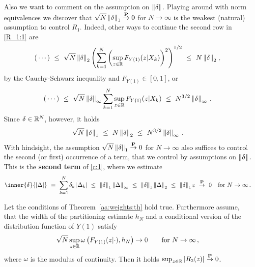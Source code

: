 \begin{remark}
  Also we want to comment on the assumption on $\left\lVert\delta\right\rVert$.
  Playing around with norm equivalences we discover that 
  $\sqrt{N}\left\lVert\delta\right\rVert_1\overset{\mathbf{P}}{\to}0$ for $N\to \infty$ is the weakest
  (natural) assumption to
  control $R_1$.
  Indeed, other ways to continue the second row in \eqref{R_1:1} are
  \begin{gather*}
    (\,\cdots)
    \ 
  \le
    \ 
  \sqrt{N}
  \norm{\delta}_2
  \left( 
  \sum_{k=1}^{N} 
  \left( 
    \sup_{z\in\R}
  F_{Y(1)}(z|X_k)
  \right)^2
\right)^{1/2}
\ 
\le
\ 
N
  \norm{\delta}_2\,,
  \end{gather*}
  by the Cauchy-Schwarz inequality and
  $
  F_{Y(1)}\in [0,1]
  $,
or
\begin{gather*}
  (\,\cdots)
  \ 
  \le
  \ 
  \sqrt{N}
  \norm{\delta}_\infty
  \sum_{k=1}^{N} 
    \sup_{z\in\R}
  F_{Y(1)}(z|X_k)
  \ 
  \le
  \ 
  N^{3/2}
  \norm{\delta}_\infty
  \,.
\end{gather*}
Since $\delta\in \mathbb{R}^N$, however, it holds
\begin{gather*}
  \sqrt{N}\norm{\delta}_1
  \ 
  \le
  \ 
  N\norm{\delta}_2
  \ 
  \le
  \ 
  N^{3/2}\norm{\delta}_\infty
  \,.
\end{gather*}
With hindsight, the assumption 
$\sqrt{N}\left\lVert\delta\right\rVert_1\overset{\mathbf{P}}{\to}0$ for $N\to \infty$ 
  also 
  suffices 
  to control the second (or first) occurrence of a term, that we control by assumptions on $\left\lVert\delta\right\rVert$.
This is the \textbf{second term} of \eqref{c:1}, where we estimate
\begin{gather*}
  \inner{\delta}{\left| \Delta \right|}
  \ 
  =
  \ 
  \sum_{k=1}^{N} 
  \delta_k
  \left| \Delta_k \right|
  \ 
  \le
  \ 
  \norm{\delta}_1
  \norm{\Delta}_\infty
  \ 
  \le
  \ 
  \norm{\delta}_1
  \norm{\Delta}_2
  \ 
  \le
  \ 
  \norm{\delta}_1
  \varepsilon
  \ 
  \overset{\P}{\to}
  \ 
  0
  \quad
  \text{for}\ 
  N\to \infty
  \,.
\end{gather*}

\end{remark}
  \begin{lemma}
    \label{aa:mean:l:r2}
    Let the conditions of Theorem~\ref{aa:weights:th} hold true.
    Furthermore assume, that the width of the partitioning estimate $h_N$ and a conditional version of the distribution function of $Y(1)$ satisfy
\begin{gather*}
  \sqrt{N}
  \sup_{z\in\R}
  \omega
  \left( 
    F_{Y(1)}(z|\cdot)
    ,h_N
  \right)
  \to
  0
  \qquad
  \text{for}\ 
  N\to \infty
  \,,
\end{gather*}
where $\omega$ is the modulus of continuity.
Then it holds
$\sup_{z\in\mathbb{R}}|R_2(z)|\overset{\mathbf{P}}{\to}0$.
  \end{lemma}
